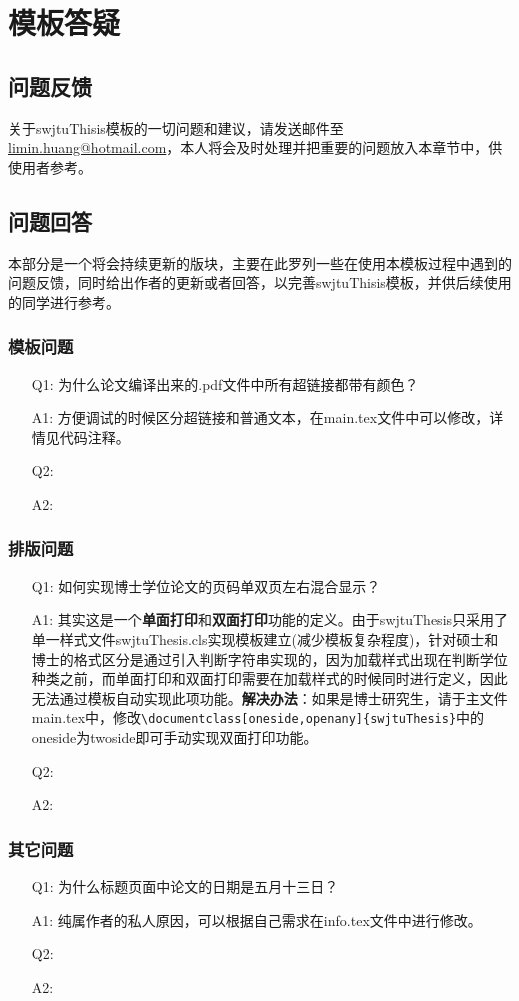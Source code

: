 \chapter{模板答疑}

\section{问题反馈}
\label{sec:contact}
关于swjtuThisis模板的一切问题和建议，请发送邮件至\href{mailto:limin.huang@hotmail.com}{limin.huang@hotmail.com}，本人将会及时处理并把重要的问题放入本章节中，供使用者参考。

\section{问题回答}
本部分是一个将会持续更新的版块，主要在此罗列一些在使用本模板过程中遇到的问题反馈，同时给出作者的更新或者回答，以完善swjtuThisis模板，并供后续使用的同学进行参考。

\subsection{模板问题}
\begin{enumerate}
	\item[Q1:]为什么论文编译出来的.pdf文件中所有超链接都带有颜色？
	\item[A1:]方便调试的时候区分超链接和普通文本，在main.tex文件中可以修改，详情见代码注释。
	\item[Q2:]
	\item[A2:]
\end{enumerate}

\subsection{排版问题}
\begin{enumerate}
	\item[Q1:]如何实现博士学位论文的页码单双页左右混合显示？
	\item[A1:]其实这是一个\textbf{单面打印}和\textbf{双面打印}功能的定义。由于swjtuThesis只采用了单一样式文件swjtuThesis.cls实现模板建立(减少模板复杂程度)，针对硕士和博士的格式区分是通过引入判断字符串实现的，因为加载样式出现在判断学位种类之前，而单面打印和双面打印需要在加载样式的时候同时进行定义，因此无法通过模板自动实现此项功能。\textbf{解决办法}：如果是博士研究生，请于主文件main.tex中，修改\verb|\documentclass[oneside,openany]{swjtuThesis}|中的oneside为twoside即可手动实现双面打印功能。	
	\item[Q2:]
	\item[A2:]
\end{enumerate}

\subsection{其它问题}
\begin{enumerate}
	\item[Q1:]为什么标题页面中论文的日期是五月十三日？
	\item[A1:]纯属作者的私人原因，可以根据自己需求在info.tex文件中进行修改。
	\item[Q2:]
	\item[A2:]
\end{enumerate}

